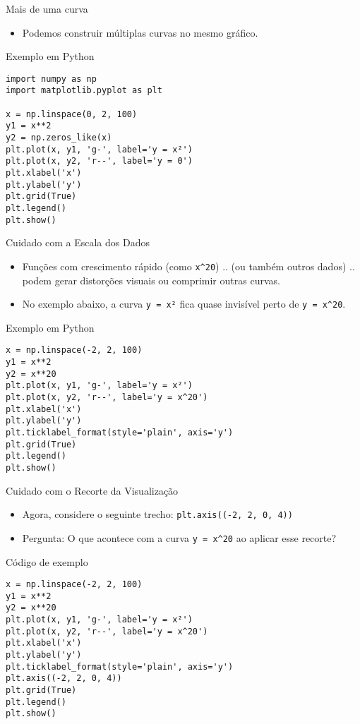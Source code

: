 \begin{frame}[fragile]{Mais de uma curva}
    \begin{itemize}
        \item Podemos construir múltiplas curvas no mesmo gráfico.
    \end{itemize}

    \begin{block}{Exemplo em Python}
\begin{verbatim}
import numpy as np
import matplotlib.pyplot as plt

x = np.linspace(0, 2, 100)
y1 = x**2
y2 = np.zeros_like(x)
plt.plot(x, y1, 'g-', label='y = x²')
plt.plot(x, y2, 'r--', label='y = 0')
plt.xlabel('x')
plt.ylabel('y')
plt.grid(True)
plt.legend()
plt.show()
\end{verbatim}
    \end{block}
\end{frame}

\begin{frame}[fragile]{Cuidado com a Escala dos Dados}
    \begin{itemize}
        \item Funções com crescimento rápido (como \texttt{x\^{}20}) .. (ou também outros dados) .. podem gerar distorções visuais ou comprimir outras curvas.
        \item No exemplo abaixo, a curva \texttt{y = x²} fica quase invisível perto de \texttt{y = x\^{}20}.
    \end{itemize}

    \begin{block}{Exemplo em Python}
\begin{verbatim}
x = np.linspace(-2, 2, 100)
y1 = x**2
y2 = x**20
plt.plot(x, y1, 'g-', label='y = x²')
plt.plot(x, y2, 'r--', label='y = x^20')
plt.xlabel('x')
plt.ylabel('y')
plt.ticklabel_format(style='plain', axis='y')
plt.grid(True)
plt.legend()
plt.show()
\end{verbatim}
    \end{block}
\end{frame}

\begin{frame}[fragile]{Cuidado com o Recorte da Visualização}
    \begin{itemize}
        \item Agora, considere o seguinte trecho: \texttt{plt.axis((-2, 2, 0, 4))}
        
        \item \alert{Pergunta: O que acontece com a curva \texttt{y = x\^{}20} ao aplicar esse recorte?}
    \end{itemize}

    \begin{block}{Código de exemplo}
\begin{verbatim}
x = np.linspace(-2, 2, 100)
y1 = x**2
y2 = x**20
plt.plot(x, y1, 'g-', label='y = x²')
plt.plot(x, y2, 'r--', label='y = x^20')
plt.xlabel('x')
plt.ylabel('y')
plt.ticklabel_format(style='plain', axis='y')
plt.axis((-2, 2, 0, 4))  
plt.grid(True)
plt.legend()
plt.show()
\end{verbatim}
    \end{block}
\end{frame}

